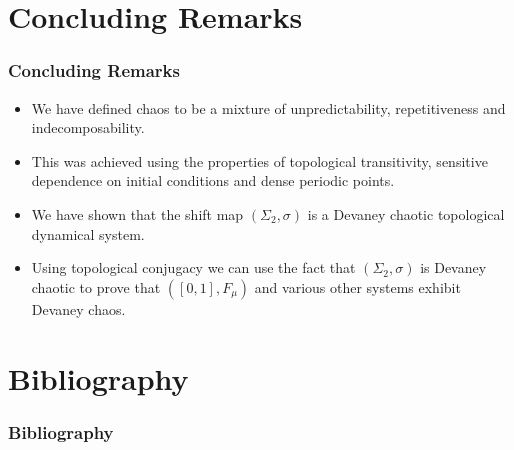 \documentclass{beamer}
\begin{document}
\section{Concluding Remarks}
\begin{frame}
    \frametitle{Concluding Remarks}
    \begin{itemize}
        \item We have defined chaos to be a mixture of unpredictability, repetitiveness and indecomposability.
        \item This was achieved using the properties of topological transitivity, sensitive dependence on initial conditions and dense periodic points.
        \item We have shown that the shift map $(\Sigma_2, \sigma)$ is a Devaney chaotic topological dynamical system.
        \item Using topological conjugacy we can use the fact that $(\Sigma_2, \sigma)$ is Devaney chaotic to prove that  $([0, 1], F_\mu)$ and various other systems exhibit Devaney chaos.
    \end{itemize}
\end{frame}

\section{Bibliography}
\begin{frame}
    \frametitle{Bibliography}
    
\end{frame}
\end{document}
